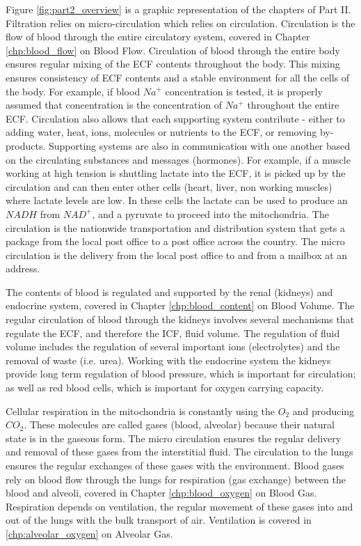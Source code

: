 Figure \ref{fig:part2_overview} is a graphic representation of the chapters of Part II. Filtration relies on micro-circulation which relies on circulation. Circulation is the flow of blood through the entire circulatory system, covered in Chapter \ref{chp:blood_flow} on Blood Flow. Circulation of blood through the entire body ensures regular mixing of the ECF contents throughout the body. This mixing ensures consistency of ECF contents and a stable environment for all the cells of the body. For example, if blood $Na^+$ concentration is tested, it is properly assumed that concentration is the concentration of $Na^+$ throughout the entire ECF. Circulation also allows that each supporting system contribute - either to adding water, heat, ions, molecules or nutrients to the ECF, or removing by-products. Supporting systems are also in communication with one another based on the circulating substances and messages (hormones). For example, if a muscle working at high tension is shuttling lactate into the ECF, it is picked up by the circulation and can then enter other cells (heart, liver, non working muscles) where lactate levels are low. In these cells the lactate can be used to produce an $NADH$ from $NAD^+$, and a pyruvate to proceed into the mitochondria. The circulation is the nationwide transportation and distribution system that gets a package from the local post office to a post office across the country. The micro circulation is the delivery from the local post office to and from a mailbox at an address.

The contents of blood is regulated and supported by the renal (kidneys) and endocrine system, covered in Chapter \ref{chp:blood_content} on Blood Volume. The regular circulation of blood through the kidneys involves several mechanisms that regulate the ECF, and therefore the ICF, fluid volume. The regulation of fluid volume includes the regulation of several important ions (electrolytes) and the removal of waste (i.e. urea). Working with the endocrine system the kidneys provide long term regulation of blood pressure, which is important for circulation; as well as red blood cells, which is important for oxygen carrying capacity.

Cellular respiration in the mitochondria is constantly using the $O_2$ and producing $CO_2$. These molecules are called gases (blood, alveolar) because their natural state is in the gaseous form. The micro circulation ensures the regular delivery and removal of these gases from the interstitial fluid. The circulation to the lungs ensures the regular exchanges of these gases with the environment. Blood gases rely on blood flow through the lungs for respiration (gas exchange) between the blood and alveoli, covered in Chapter \ref{chp:blood_oxygen} on Blood Gas. Respiration depends on ventilation, the regular movement of these gases into and out of the lungs with the bulk transport of air. Ventilation is covered in \ref{chp:alveolar_oxygen} on Alveolar Gas. 

